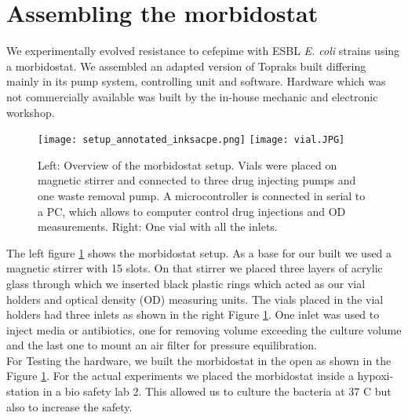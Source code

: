\section{Assembling the morbidostat}
We experimentally evolved resistance to cefepime with ESBL \textit{E. coli} strains using a morbidostat. We assembled an adapted version of Topraks built differing mainly in its pump system, controlling unit and software. Hardware which was not commercially available was built by the in-house mechanic and electronic workshop.

\begin{figure}
	\texttt{[image: setup\_annotated\_inksacpe.png]}
	\texttt{[image: vial.JPG]}
	\caption{Left: Overview of the morbidostat setup. Vials were placed on magnetic stirrer and connected to three drug injecting pumps and one waste removal pump. A microcontroller is connected in serial to a PC, which allows to computer control drug injections and OD measurements. Right: One vial with all the inlets.}
	\label{figure:morbidostat_setup}
\end{figure}  
The left figure \ref{figure:morbidostat_setup} shows the morbidostat setup.
As a base for our built we used a magnetic stirrer with 15 slots. On that stirrer we placed three layers of acrylic glass through which we inserted black plastic rings which acted as our vial holders and optical density (OD) measuring units. 
The vials placed in the vial holders had three inlets as shown in the right Figure \ref{figure:morbidostat_setup}. One inlet was used to inject media or antibiotics, one for removing volume exceeding the culture volume and the last one to mount an air filter for pressure equilibration. \\
For Testing the hardware, we built the morbidostat in the open as shown in the Figure \ref{figure:morbidostat_setup}. For the actual experiments we placed the morbidostat inside a hypoxi-station in a bio safety lab 2. This allowed us to culture the bacteria at 37 \degree C but also to increase the safety. 


